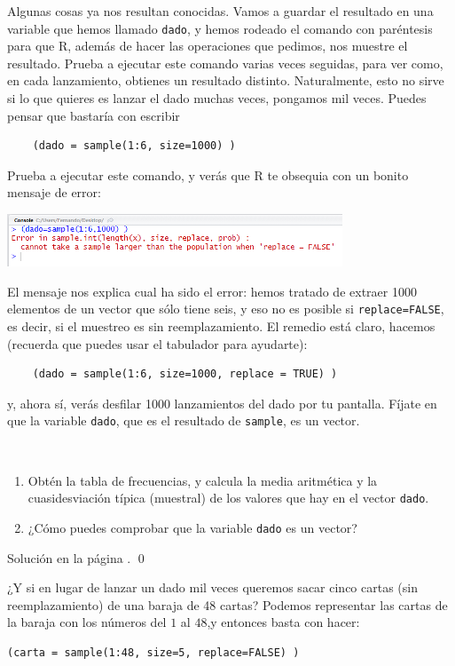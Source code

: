 \documentclass[10pt,a4paper]{article}\usepackage[]{graphicx}\usepackage[]{color}
\begin{document}
Algunas cosas ya nos resultan conocidas. Vamos a guardar el resultado en una variable que hemos llamado {\tt dado}, y hemos rodeado el comando con paréntesis para que R, además de hacer las operaciones que pedimos, nos muestre el resultado. Prueba a ejecutar este comando varias veces seguidas, para ver como, en cada lanzamiento, obtienes un resultado distinto. Naturalmente, esto no sirve si lo que quieres es lanzar el dado muchas veces, pongamos mil veces. Puedes pensar que bastaría con escribir
\begin{verbatim}
    (dado = sample(1:6, size=1000) )
\end{verbatim}
Prueba a ejecutar este comando, y verás que R te obsequia con un bonito mensaje de error:
    \begin{center}
    \includegraphics[width=10cm]{../fig/Tut04-01.png}
    \end{center}
El mensaje nos explica cual ha sido el error: hemos tratado de extraer 1000 elementos de un vector que sólo tiene seis, y eso no es posible si {\tt replace=FALSE}, es decir, si el muestreo es sin reemplazamiento. El remedio está claro, hacemos (recuerda que puedes usar el tabulador para ayudarte):
\begin{verbatim}
    (dado = sample(1:6, size=1000, replace = TRUE) )
\end{verbatim}
y, ahora sí, verás desfilar 1000 lanzamientos del dado por tu pantalla. Fíjate en que la variable {\tt dado}, que es el resultado de {\tt sample}, es un vector.
\begin{ejercicio}
\label{tut02:ejercicio22}
\quad\\
\begin{enumerate}
  \item Obtén la tabla de frecuencias, y calcula la media aritmética y la cuasidesviación típica (muestral) de los valores que hay en el vector {\tt dado}.

  \item ¿Cómo puedes comprobar que la variable {\tt dado} es un vector?
\end{enumerate}
Solución en la página \pageref{tut02:ejercicio22:sol}. \qed
\end{ejercicio}

¿Y si en lugar de lanzar un dado mil veces queremos sacar cinco cartas (sin reemplazamiento) de una baraja de 48 cartas? Podemos representar las cartas de la baraja con los números del $1$ al $48$,y entonces basta con hacer:
\begin{verbatim}
(carta = sample(1:48, size=5, replace=FALSE) )
\end{verbatim}
\end{document}
